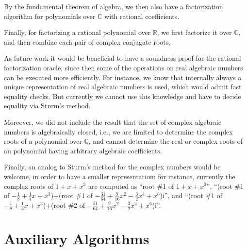\documentclass[11pt,a4paper]{article}
\newcommand\rats{\mathbb{Q}}
\newcommand\reals{\mathbb{R}}
\newcommand\complex{\mathbb{C}}
\begin{document}
By the fundamental theorem of algebra, we then also have a factorization algorithm for
polynomials over $\complex$ with rational coefficients.

Finally, for factorizing a rational polynomial over $\reals$, we first factorize it over $\complex$,
and then combine each pair of complex conjugate roots.

\medskip

As future work it would be beneficial to have a soundness proof for the rational factorization 
oracle, since then some of the operations on real algebraic numbers can be executed more 
efficiently. For instance, we know that internally always a unique representation of 
real algebraic numbers is used, which would admit fast equality checks. But currently 
we cannot use this knowledge and have to decide equality via Sturm's method.

Moreover, we did not include the result that the set of complex algebraic numbers is algebraically
closed, i.e., we are limited to determine the complex roots of a polynomial over $\rats$, and
cannot determine the real or complex roots of an polynomial having arbitrary algebraic coefficients.

Finally, an analog to Sturm's method for the complex numbers would be welcome, in order to
have a smaller representation: for instance, currently the complex roots of $1 + x + x^3$ are
computed as ``root \#1 of $1 + x + x^3$'', 
``(root \#1 of $-\frac18 + \frac14x + x^3$)+(root \#1 of $-\frac{31}{64} + \frac{9}{16}x^2 - \frac32x^4 + x^6$)i'', and 
``(root \#1 of $-\frac18 + \frac14x + x^3$)+(root \#2 of $-\frac{31}{64} + \frac{9}{16}x^2 - \frac32x^4 + x^6$)i''.

\section{Auxiliary Algorithms}








\end{document}
